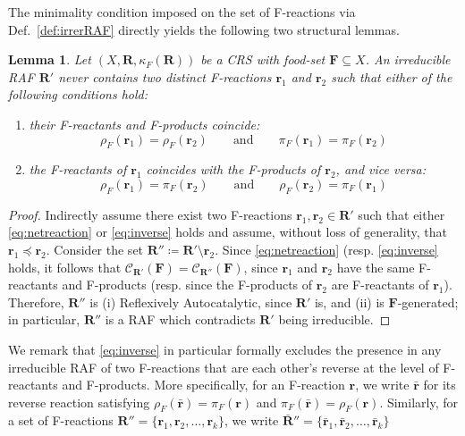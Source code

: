 \documentclass[pdflatex]{sn-jnl}
\theoremstyle{thmstyleone}%
\newtheorem{lemma}[theorem]{Lemma}%
\theoremstyle{examplesty}%
\theoremstyle{thmstylethree}%
\newcommand{\food}{\ensuremath{\mathbf{F}}}
\newcommand{\closure}[2]{\mathscr{C}_{#1}(#2)}
\newcommand{\FR}[0]{\mathbf{R}}
\newcommand{\fr}[0]{\mathbf{r}}
\newcommand{\RAF}[0]{\mathbf{R}'}
\newcommand{\cat}{\kappa_F}
\newcommand{\feducts}{\rho_F}
\newcommand{\fproducts}{\pi_F}
\begin{document}
The minimality condition imposed on the set of F-reactions via
Def.~\ref{def:irrerRAF} directly yields the following two structural lemmas.
\vspace{6pt}
\begin{lemma}\label{lem:OneFReacPerRAF}
  Let $(X,\FR,\cat(\FR))$ be a CRS with food-set $\food\subseteq X$. An
  irreducible RAF $\RAF$ never contains two distinct F-reactions $\fr_1$
  and $\fr_2$ such that either of the following conditions hold:
  \begin{enumerate}
  \item their F-reactants and F-products coincide: 
  \begin{equation}\label{eq:netreaction}
    \feducts(\fr_1)=\feducts(\fr_2) \qquad\text{and}\qquad
    \fproducts(\fr_1)=\fproducts(\fr_2) 
  \end{equation}
\item the F-reactants of $\fr_1$ coincides with the F-products of $\fr_2$,
  and vice versa:
  \begin{equation}\label{eq:inverse}
    \feducts(\fr_1)=\fproducts(\fr_2) \qquad\text{and}\qquad
    \feducts(\fr_2)=\fproducts(\fr_1) 
  \end{equation}
\end{enumerate}
\end{lemma}
\begin{proof}
  Indirectly assume there exist two F-reactions $\fr_1,\fr_2\in \RAF$ such
  that either \eqref{eq:netreaction} or \eqref{eq:inverse} holds and
  assume, without loss of generality, that $\fr_1\preceq \fr_2$. Consider
  the set $\RAF'\coloneqq \RAF \setminus \fr_2$. Since
  \eqref{eq:netreaction} (resp. \eqref{eq:inverse} holds, it follows that
  $\closure{\RAF}{\food} = \closure{\RAF'}{\food}$, since $\fr_1$ and
  $\fr_2$ have the same F-reactants and F-products (resp. since the
  F-products of $\fr_2$ are F-reactants of $\fr_1$). Therefore, $\RAF'$ is
  (i) Reflexively Autocatalytic, since $\RAF$ is, and (ii) is
  $\food$-generated; in particular, $\RAF'$ is a RAF which contradicts
  $\RAF$ being irreducible.
\end{proof}
We remark that \eqref{eq:inverse} in particular formally excludes the presence 
in any irreducible RAF of two F-reactions that are each other's reverse at the 
level of F-reactants and F-products. More specifically, for an F-reaction $\fr$, 
we write $\bar{\fr}$ for its reverse reaction satisfying 
$\feducts(\bar{\fr})=\fproducts(\fr)$ and $\fproducts(\bar{\fr})=\feducts(\fr)$. Similarly, for 
a set of F-reactions $
  \RAF' = \{\fr_1,\fr_2,\ldots,\fr_k\}$, we write $\bar{\FR}'' = \{\bar{\fr}_1,\bar{\fr}_2,\ldots,\bar{\fr}_k\}$ 
\end{document}
